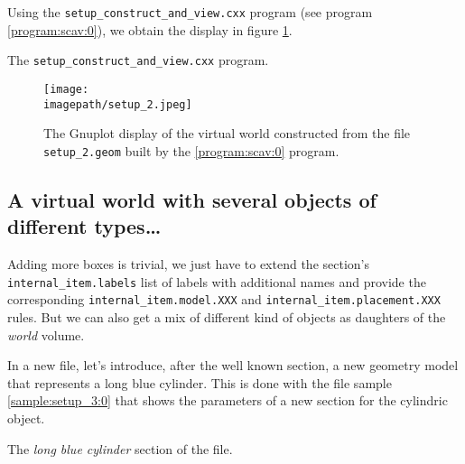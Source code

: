 Using   the   \texttt{setup\_construct\_and\_view.cxx}  program   (see
program  \ref{program:scav:0}),  we   obtain  the  display  in  figure
\ref{fig:setup_2:0}. 

\begin{program}[hp]
\caption{The \texttt{setup\_construct\_and\_view.cxx} program.}
\label{program:scav:0}
\end{program}

\begin{figure}[h]
\begin{center}
\texttt{[image: \\imagepath/setup\_2.jpeg]}
\end{center}
\caption{The Gnuplot  display of the  virtual world constructed
  from   the   file   \texttt{setup\_2.geom}  built   by   the
  \ref{program:scav:0} program.}\label{fig:setup_2:0}
\end{figure}


\clearpage

\subsection{A virtual world with several objects of different types\dots}

Adding more  boxes is trivial, we  just have to  extend the 
section's   \texttt{internal\_item.labels}   list   of   labels   with
additional      names      and      provide     the      corresponding
\texttt{internal\_item.model.XXX}                                   and
\texttt{internal\_item.placement.XXX}  rules.  But we  can also  get a
mix  of different  kind of  objects as  daughters of  the \emph{world}
volume.  

In  a new    file, let's  introduce,  after the  
well known   section,  a new  geometry  model that
represents a  long blue cylinder.  This  is done with  the file sample
\ref{sample:setup_3:0} that shows the  parameters of a new section for
the cylindric object.

\begin{sample}[h]
\caption{The \emph{long blue cylinder}
  section of the   file.}
\label{sample:setup_3:0}
\end{sample}

